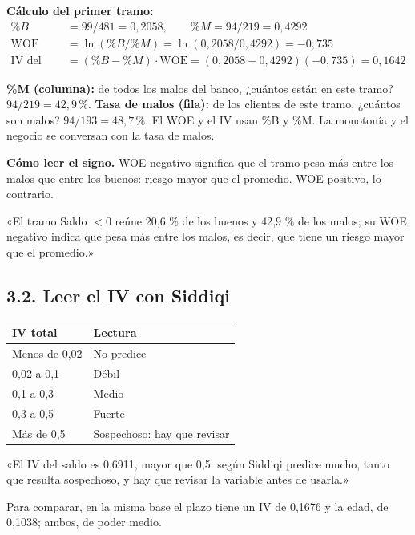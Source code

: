 \documentclass[11pt,letterpaper]{article}
\newcommand{\tema}[1]{\subsection*{#1}}
\begin{document}
\textbf{Cálculo del primer tramo:}
\begin{align*}
\%B&=99/481=0{,}2058, \qquad \%M=94/219=0{,}4292\\
\text{WOE}&=\ln(\%B/\%M)=\ln(0{,}2058/0{,}4292)=-0{,}735\\
\text{IV del tramo}&=(\%B-\%M)\cdot\text{WOE}=(0{,}2058-0{,}4292)(-0{,}735)=0{,}1642
\end{align*}

\begin{trampa}
\textbf{\%M (columna):} de todos los malos del banco, ¿cuántos están en este tramo? $94/219=42{,}9\,\%$.\quad
\textbf{Tasa de malos (fila):} de los clientes de este tramo, ¿cuántos son malos? $94/193=48{,}7\,\%$.\quad
El WOE y el IV usan \%B y \%M. La monotonía y el negocio se conversan con la tasa de malos.
\end{trampa}

\textbf{Cómo leer el signo.} WOE negativo significa que el tramo pesa más entre los malos que entre los buenos: riesgo mayor que el promedio. WOE positivo, lo contrario.

\begin{frase}
«El tramo Saldo $<0$ reúne 20,6 \% de los buenos y 42,9 \% de los malos; su WOE negativo indica que pesa más entre los malos, es decir, que tiene un riesgo mayor que el promedio.»
\end{frase}

\tema{3.2. Leer el IV con Siddiqi}

\begin{center}
\begin{tabular}{ll}
\toprule
\textbf{IV total} & \textbf{Lectura} \\
\midrule
Menos de 0,02 & No predice \\
0,02 a 0,1 & Débil \\
0,1 a 0,3 & Medio \\
0,3 a 0,5 & Fuerte \\
Más de 0,5 & Sospechoso: hay que revisar \\
\bottomrule
\end{tabular}
\end{center}

\begin{frase}
«El IV del saldo es 0,6911, mayor que 0,5: según Siddiqi predice mucho, tanto que resulta sospechoso, y hay que revisar la variable antes de usarla.»
\end{frase}

Para comparar, en la misma base el plazo tiene un IV de 0,1676 y la edad, de 0,1038; ambos, de poder medio.
\end{document}
